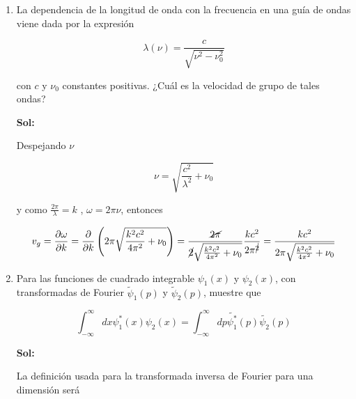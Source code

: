 \documentclass[12pt,a4paper]{article}
\begin{document}
\begin{enumerate}
\begin{enumerate}
    \end{enumerate}
    \newpage



    
    
    
    \item La dependencia de la longitud de onda con la frecuencia en una guía de ondas viene dada por la expresión
    
    \begin{equation*}
        \lambda(\nu)= \frac{c}{\sqrt{\nu^2 - \nu_{0}^{2}}}
    \end{equation*}
    
    con $c$ y $\nu_0$ constantes positivas. ¿Cuál es la velocidad de grupo de tales ondas?
    
    \textbf{Sol:}
    
    Despejando $\nu$
    
    \begin{equation*}
        \nu = \sqrt{\frac{c^2}{\lambda^2} + \nu_ 0}
    \end{equation*}
    
    y como $\frac{2 \pi}{\lambda} = k $ , $\omega = 2 \pi \nu$, entonces
    
    \begin{equation*}
        v_g = \frac{\partial \omega}{\partial k} = \frac{\partial}{\partial k} \left(2\pi \sqrt{\frac{k^2c^2}{4\pi^2}+ \nu_0}\right) = \frac{\cancel{2\pi}}{\cancel{2}\sqrt{\frac{k^2c^2}{4\pi^2}+ \nu_0}} \frac{kc^2}{2 \pi^{\cancel{2}}} = \frac{kc^2}{2\pi \sqrt{\frac{k^2c^2}{4\pi^2}+ \nu_0}}
    \end{equation*}
    
    



    
    
    
    \item Para las funciones de cuadrado integrable $\psi_1(x)$ y  $\psi_2(x)$, con transformadas de Fourier $\tilde{\psi}_1(p)$ y $\tilde{\psi}_2(p)$, muestre que
    
    \begin{equation*}
        \int_{-\infty}^{\infty}dx \psi_{1}^{*}(x)\psi_{2}(x) = \int_{-\infty}^{\infty}dp \tilde{\psi_{1}^{*}}(p)\tilde{\psi_{2}}(p)
    \end{equation*}
    
    \textbf{Sol:}
    
    La definición usada para la transformada inversa de Fourier para una dimensión será
    

\end{enumerate}
\end{document}

